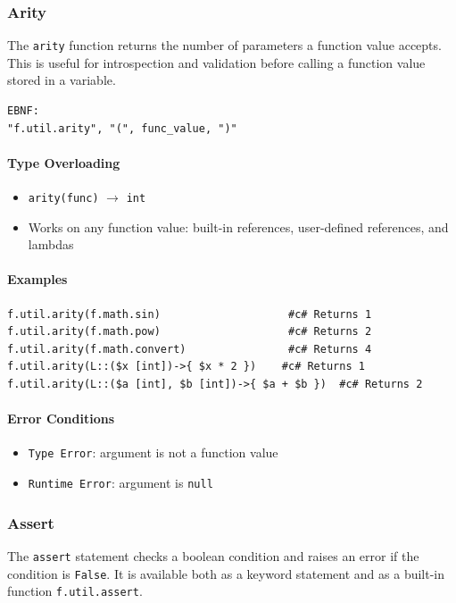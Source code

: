 \subsubsection{Arity}
The \texttt{arity} function returns the number of parameters a function value accepts. This is useful for introspection and validation before calling a function value stored in a variable.
\begin{verbatim}
EBNF:
"f.util.arity", "(", func_value, ")"
\end{verbatim}

\paragraph{Type Overloading}
\begin{itemize}
\item \texttt{arity(func)} $\rightarrow$ \texttt{int}
\item Works on any function value: built-in references, user-defined references, and lambdas
\end{itemize}

\paragraph{Examples}
\begin{verbatim}
f.util.arity(f.math.sin)                    #c# Returns 1
f.util.arity(f.math.pow)                    #c# Returns 2
f.util.arity(f.math.convert)                #c# Returns 4
f.util.arity(L::($x [int])->{ $x * 2 })    #c# Returns 1
f.util.arity(L::($a [int], $b [int])->{ $a + $b })  #c# Returns 2
\end{verbatim}

\paragraph{Error Conditions}
\begin{itemize}
\item \texttt{Type Error}: argument is not a function value
\item \texttt{Runtime Error}: argument is \texttt{null}
\end{itemize}

\subsubsection{Assert}
\label{sec:assert}
The \texttt{assert} statement checks a boolean condition and raises an error if the condition is \texttt{False}. It is available both as a keyword statement and as a built-in function \texttt{f.util.assert}.

